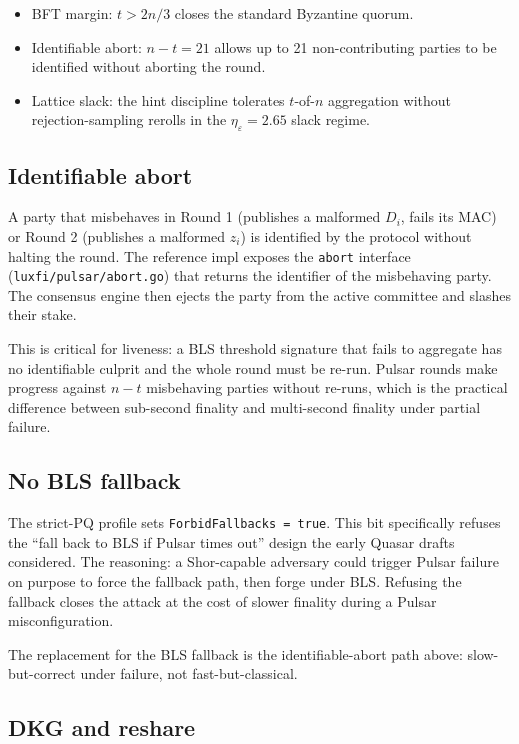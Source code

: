\begin{itemize}[leftmargin=2em,nosep]
  \item BFT margin: $t > 2n/3$ closes the standard Byzantine quorum.
  \item Identifiable abort: $n - t = 21$ allows up to 21 non-contributing
    parties to be identified without aborting the round.
  \item Lattice slack: the hint discipline tolerates $t$-of-$n$ aggregation
    without rejection-sampling rerolls in the $\eta_\varepsilon = 2.65$ slack
    regime.
\end{itemize}

\subsection{Identifiable abort}

A party that misbehaves in Round 1 (publishes a malformed $D_i$, fails its
MAC) or Round 2 (publishes a malformed $z_i$) is identified by the protocol
without halting the round. The reference impl exposes the
\texttt{abort} interface (\texttt{luxfi/pulsar/abort.go}) that
returns the identifier of the misbehaving party. The consensus engine then
ejects the party from the active committee and slashes their stake.

This is critical for liveness: a BLS threshold signature that fails to
aggregate has no identifiable culprit and the whole round must be re-run.
Pulsar rounds make progress against $n - t$ misbehaving parties without
re-runs, which is the practical difference between sub-second finality and
multi-second finality under partial failure.

\subsection{No BLS fallback}

The strict-PQ profile sets \texttt{ForbidFallbacks = true}. This bit
specifically refuses the ``fall back to BLS if Pulsar times out'' design
the early Quasar drafts considered. The reasoning: a Shor-capable adversary
could trigger Pulsar failure on purpose to force the fallback path, then
forge under BLS. Refusing the fallback closes the attack at the cost of
slower finality during a Pulsar misconfiguration.

The replacement for the BLS fallback is the identifiable-abort path above:
slow-but-correct under failure, not fast-but-classical.

\subsection{DKG and reshare}

